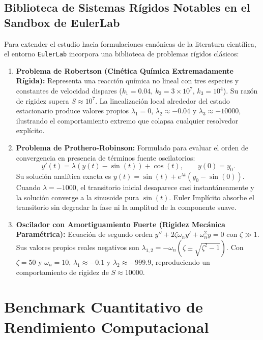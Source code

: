 \documentclass[11pt,a4paper]{article}
\begin{document}
\subsection{Biblioteca de Sistemas Rígidos Notables en el Sandbox de EulerLab}
Para extender el estudio hacia formulaciones canónicas de la literatura científica, el entorno \texttt{EulerLab} incorpora una biblioteca de problemas rígidos clásicos:
\begin{enumerate}
    \item \textbf{Problema de Robertson (Cinética Química Extremadamente Rígida):}
    Representa una reacción química no lineal con tres especies y constantes de velocidad dispares ($k_1 = 0.04$, $k_2 = 3 \times 10^7$, $k_3 = 10^4$). Su razón de rigidez supera $S \approx 10^7$. La linealización local alrededor del estado estacionario produce valores propios $\lambda_1 = 0$, $\lambda_2 \approx -0.04$ y $\lambda_3 \approx -10000$, ilustrando el comportamiento extremo que colapsa cualquier resolvedor explícito.
    \item \textbf{Problema de Prothero-Robinson:}
    Formulado para evaluar el orden de convergencia en presencia de términos fuente oscilatorios:
    \begin{equation}
        y'(t) = \lambda \left( y(t) - \sin(t) \right) + \cos(t), \qquad y(0) = y_0.
    \end{equation}
    Su solución analítica exacta es $y(t) = \sin(t) + e^{\lambda t}(y_0 - \sin(0))$. Cuando $\lambda = -1000$, el transitorio inicial desaparece casi instantáneamente y la solución converge a la sinusoide pura $\sin(t)$. Euler Implícito absorbe el transitorio sin degradar la fase ni la amplitud de la componente suave.
    \item \textbf{Oscilador con Amortiguamiento Fuerte (Rigidez Mecánica Paramétrica):}
    Ecuación de segundo orden $y'' + 2\zeta\omega_n y' + \omega_n^2 y = 0$ con $\zeta \gg 1$. Sus valores propios reales negativos son $\lambda_{1,2} = -\omega_n (\zeta \pm \sqrt{\zeta^2 - 1})$. Con $\zeta = 50$ y $\omega_n = 10$, $\lambda_1 \approx -0.1$ y $\lambda_2 \approx -999.9$, reproduciendo un comportamiento de rigidez de $S \approx 10000$.
\end{enumerate}

\section{Benchmark Cuantitativo de Rendimiento Computacional}
\end{document}

